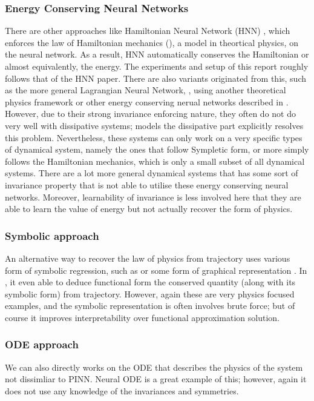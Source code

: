 \documentclass{statsmsc}
\begin{document}
\subsubsection{Energy Conserving Neural Networks}
There are other approaches like Hamiltonian Neural Network (HNN) \cite{HNN}, which enforces the law of Hamiltonian mechanics (\cite{lemos_2018}), a model in theortical physics, on the neural network.
As a result, HNN automatically conserves the Hamiltonian or almost equivalently, the energy.
The experiments and setup of this report roughly follows that of the HNN paper.
There are also variants originated from this, such as the more general Lagrangian Neural Network, \cite{Cranmer2020}, using another theoretical physics framework or other energy conserving nerual networks described in \cite{Zhong2021}.
However, due to their strong invariance enforcing nature, they often do not do very well with dissipative systems; 
\cite{DissipativeHNN} models the dissipative part explicitly resolves this problem.
Nevertheless, these systems can only work on a very specific types of dynamical system, namely the ones that follow Sympletic form, or more simply follows the Hamiltonian mechanics, which is only a small subset of all dynamical systems.
There are a lot more general dynamical systems that has some sort of invariance property that is not able to utilise these energy conserving neural networks.
Moreover, learnability of invariance is less involved here that they are able to learn the value of energy but not actually recover the form of physics. 

\subsubsection{Symbolic approach}
An alternative way to recover the law of physics from trajectory uses various form of symbolic regression, such as \cite{Udrescu2020, Papastamatiou2022} or some form of graphical representation \cite{GraphSymbolicPhysics, flexiblePhysics}.
In \cite{Liu2021}, it even able to deduce functional form the conserved quantity (along with its symbolic form) from trajectory.
However, again these are very physics focused examples, and the symbolic representation is often involves brute force; but of course it improves interpretability over functional approximation solution.

\subsubsection{ODE approach}
We can also directly works on the ODE that describes the physics of the system not dissimliar to PINN. 
Neural ODE \cite{NeuralODE} is a great example of this; 
however, again it does not use any knowledge of the invariances and symmetries.
\end{document}
